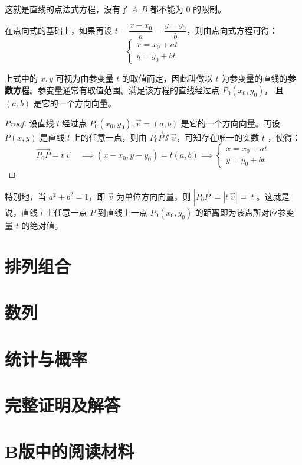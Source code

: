 \documentclass[a4paper,openany]{ctexbook}
\renewcommand{\vec}{\overrightarrow}
\renewcommand{\parallel}{\varparallel} \newcommand{\ii}{\,\mathrm{i}} \newcommand{\allproofs}{}
\begin{document}
这就是直线的点法式方程，没有了 \(A,B\) 都不能为 \(0\) 的限制。

在点向式的基础上，如果再设 \(t = \dfrac{x - x_0}{a} = \dfrac{y - y_0}{b} \)，则由点向式方程可得：
\[\begin{cases}
        x=x_0+at \\
        y=y_0+bt
    \end{cases}\]

上式中的 \(x,y\) 可视为由参变量 \(t\) 的取值而定，因此叫做以 \(t\) 为参变量的直线的\textbf{参数方程}。参变量通常有取值范围。满足该方程的直线经过点 \(P_0(x_0,y_0)\)，
且\((a,b)\) 是它的一个方向向量。

\begin{proof}
    设直线 \(l\) 经过点 \(P_0(x_0,y_0),\vec{v} =(a,b)\) 是它的一个方向向量。再设 \(P(x,y)\) 是直线 \(l\) 上的任意一点，则由 \(\vec{P_0P} \parallel \vec{v}\)，可知存在唯一的实数 \(t\) ，使得：
    \[
        \vec{P_0P} = t\, \vec{v}\quad \implies (x - x_0,y - y_0) = t(a,b) \implies \begin{cases} x = x_0 + at\\y = y_0 + bt \end{cases}
    \]
\end{proof}

特别地，当 \(a^2 + b^2 = 1\)，即 \(\vec{v}\) 为单位方向向量，则 \(|\vec{P_0P}|=|t\, \vec{v}|=|t|\)。这就是说，直线 \(l\) 上任意一点 \(P\) 到直线上一点 \(P_0(x_0,y_0)\) 的距离即为该点所对应参变量 \(t\) 的绝对值。

\chapter{排列组合}

\chapter{数列}

\chapter{统计与概率}

\appendix

\twocolumn
\chapter{完整证明及解答}
\showproofs

\onecolumn
\chapter{B版中的阅读材料}
\end{document}
